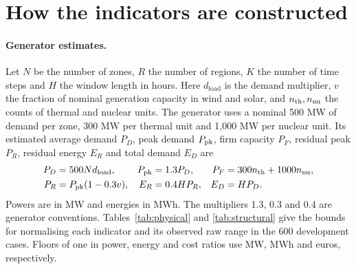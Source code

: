 \documentclass[11pt,a4paper]{article}
\begin{document}
\section{How the indicators are constructed}
\label{app:conventions}

\paragraph{Generator estimates.}
Let \(N\) be the number of zones, \(R\) the number of regions, \(K\) the number of time steps and \(H\) the window length in hours. Here \(d_\mathrm{load}\) is the demand multiplier, \(v\) the fraction of nominal generation capacity in wind and solar, and \(n_{\rm th},n_{\rm nu}\) the counts of thermal and nuclear units. The generator uses a nominal 500 MW of demand per zone, 300 MW per thermal unit and 1,000 MW per nuclear unit. Its estimated average demand \(P_D\), peak demand \(P_{\rm pk}\), firm capacity \(P_F\), residual peak \(P_R\), residual energy \(E_R\) and total demand \(E_D\) are
\begin{align}
 P_D&=500N d_\mathrm{load}, & P_{\rm pk}&=1.3P_D, & P_F&=300n_{\rm th}+1000n_{\rm nu},\nonumber\\
 P_R&=P_{\rm pk}(1-0.3v), & E_R&=0.4HP_R, & E_D&=HP_D .
 \label{eq:proxies}
\end{align}
Powers are in MW and energies in MWh. The multipliers 1.3, 0.3 and 0.4 are generator conventions. Tables~\ref{tab:physical} and \ref{tab:structural} give the bounds for normalising each indicator and its observed raw range in the 600 development cases. Floors of one in power, energy and cost ratios use MW, MWh and euros, respectively.
\end{document}
